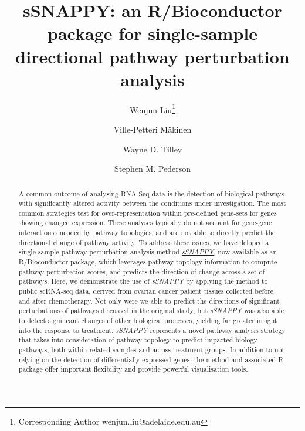 \documentclass[9pt,a4paper,]{extarticle}
\begin{document}
\pagestyle{front}

\title{sSNAPPY: an R/Bioconductor package for single-sample directional pathway perturbation analysis}

\author[1]{Wenjun Liu\thanks{\ttfamily Corresponding Author wenjun.liu@adelaide.edu.au}}
\author[2,3]{Ville-Petteri Mäkinen}
\author[1]{Wayne D. Tilley}
\author[1,4,5]{Stephen M. Pederson}

\maketitle
\thispagestyle{front}

\begin{abstract}
A common outcome of analysing RNA-Seq data is the detection of biological pathways with significantly altered activity between the conditions under investigation. The most common strategies test for over-representation within pre-defined gene-sets for genes showing changed expression\citep{Subramanian2005-lx, Young2010-jw}. These analyses typically do not account for gene-gene interactions encoded by pathway topologies, and are not able to directly predict the directional change of pathway activity. To address these issues, we have deloped a single-sample pathway perturbation analysis method \href{https://bioconductor.org/packages/sSNAPPY}{\emph{sSNAPPY}}, now available as an R/Bioconductor package, which leverages pathway topology information to compute pathway perturbation scores, and predicts the direction of change across a set of pathways. Here, we demonstrate the use of \emph{sSNAPPY} by applying the method to public scRNA-seq data, derived from ovarian cancer patient tissues collected before and after chemotherapy. Not only were we able to predict the directions of significant perturbations of pathways discussed in the original study, but \emph{sSNAPPY} was also able to detect significant changes of other biological processes, yielding far greater insight into the response to treatment. \emph{sSNAPPY} represents a novel pathway analysis strategy that takes into consideration of pathway topology to predict impacted biology pathways, both within related samples and across treatment groups. In addition to not relying on the detection of differentially expressed genes, the method and associated R package offer important flexibility and provide powerful visualisation tools.
\end{abstract}
\end{document}
